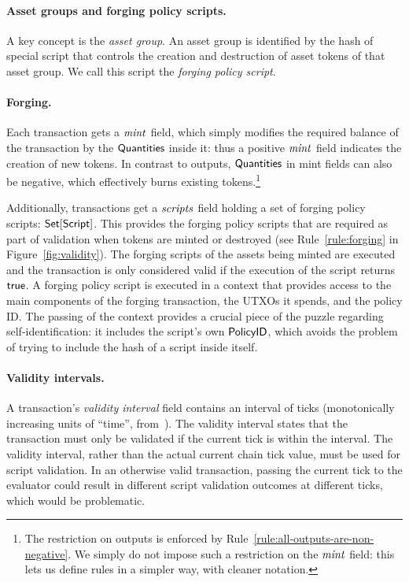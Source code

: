 \paragraph{Asset groups and forging policy scripts.}

A key concept is the \emph{asset group}.
An asset group is identified by the hash of special script that controls the creation and destruction of asset tokens of that asset group.
We call this script the \emph{forging policy script}.

\paragraph{Forging.}

Each transaction gets a $\mathit{mint}$ field, which simply modifies the required balance of the transaction by the $\textsf{Quantities}$ inside it: thus a positive $\mathit{mint}$ field indicates the creation of new tokens.
In contrast to outputs, $\textsf{Quantities}$ in mint fields can
also be negative, which effectively burns existing tokens.\footnote{
The restriction on outputs is enforced by Rule~\ref{rule:all-outputs-are-non-negative}.  We simply do not impose such a restriction on the $\mathit{mint}$ field: this lets us define rules in a simpler way, with cleaner notation. }

Additionally, transactions get a $\mathit{scripts}$ field holding a set of forging policy scripts: \(\textsf{Set}[\textsf{Script}]\).
This provides the forging policy scripts that are required as part of validation when tokens are minted or destroyed (see Rule~\ref{rule:forging} in Figure~\ref{fig:validity}). The forging scripts of the assets being minted are
executed and the transaction is only considered valid if the execution of the script returns $\textsf{true}$.
A forging policy script is executed in a context that provides access to the main components of the forging transaction, the UTXOs it spends, and the policy ID.
The passing of the context provides a crucial piece of the puzzle regarding self-identification: it includes the script's own $\textsf{PolicyID}$, which avoids the problem of trying to include the hash of a script inside itself.

\paragraph{Validity intervals.}
\label{para:validity-intervals}

A transaction's \emph{validity interval} field contains an interval of ticks (monotonically increasing units of ``time'', from~\cite{eutxo-1-paper}).
The validity interval states that the transaction must only be validated if the current tick is within the interval. The validity interval, rather than the actual current chain tick value, must be used
for script validation. In an otherwise valid transaction, passing the current
tick to the evaluator
could result in different script validation outcomes at different ticks, which
would be problematic.

